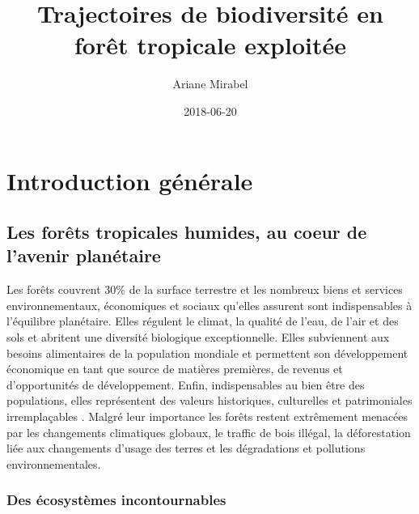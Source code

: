 \documentclass[
  11pt,
  french,
  A4paper,
  extrafontsizes,onecolumn,openright
  ]{memoir}
\title{Trajectoires de biodiversité en forêt tropicale exploitée}
\author{Ariane Mirabel}
\date{2018-06-20}
\begin{document}
\frontmatter



\makeflyleaf









\LargeMargins
{
\hypersetup{linkcolor=}
\setcounter{tocdepth}{3}
\tableofcontents
}



\LargeMargins
\mainmatter

\chapter{Introduction générale}\label{introduction-generale}

\section{Les forêts tropicales humides, au coeur de l'avenir
planétaire}\label{les-forets-tropicales-humides-au-coeur-de-lavenir-planetaire}

Les forêts couvrent 30\% de la surface terrestre et les nombreux biens
et services environnementaux, économiques et sociaux qu'elles assurent
sont indispensables à l'équilibre planétaire. Elles régulent le climat,
la qualité de l'eau, de l'air et des sols et abritent une diversité
biologique exceptionnelle. Elles subviennent aux besoins alimentaires de
la population mondiale et permettent son développement économique en
tant que source de matières premières, de revenus et d'opportunités de
développement. Enfin, indispensables au bien être des populations, elles
représentent des valeurs historiques, culturelles et patrimoniales
irremplaçables \autocites{FRA2015}{Tilman2014}. Malgré leur importance
les forêts restent extrêmement menacées par les changements climatiques
globaux, le traffic de bois illégal, la déforestation liée aux
changements d'usage des terres et les dégradations et pollutions
environnementales.

\subsection{Des écosystèmes
incontournables}\label{des-ecosystemes-incontournables}
\end{document}
